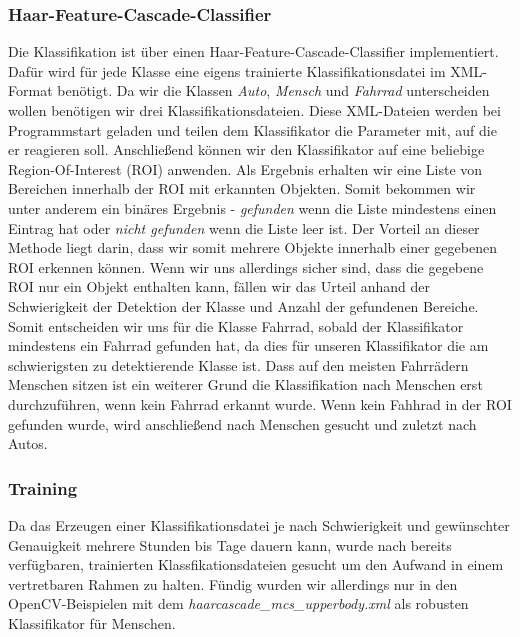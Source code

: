 \documentclass[conference]{IEEEtran}
\begin{document}
\subsubsection{Haar-Feature-Cascade-Classifier}

Die Klassifikation ist über einen Haar-Feature-Cascade-Classifier implementiert.
Dafür wird für jede Klasse eine eigens trainierte Klassifikationsdatei im XML-Format benötigt. Da wir die Klassen \textit{Auto}, \textit{Mensch} und \textit{Fahrrad} unterscheiden wollen benötigen wir drei Klassifikationsdateien. Diese XML-Dateien werden bei Programmstart geladen und teilen dem Klassifikator die Parameter mit, auf die er reagieren soll. Anschließend können wir den Klassifikator auf eine beliebige Region-Of-Interest (ROI) anwenden. Als Ergebnis erhalten wir eine Liste von Bereichen innerhalb der ROI mit erkannten Objekten. Somit bekommen wir unter anderem ein binäres Ergebnis - \textit{gefunden} wenn die Liste mindestens einen Eintrag hat oder \textit{nicht gefunden} wenn die Liste leer ist. Der Vorteil an dieser Methode liegt darin, dass wir somit mehrere Objekte innerhalb einer gegebenen ROI erkennen können. Wenn wir uns allerdings sicher sind, dass die gegebene ROI nur ein Objekt enthalten kann, fällen wir das Urteil anhand der Schwierigkeit der Detektion der Klasse und Anzahl der gefundenen Bereiche. Somit entscheiden wir uns für die Klasse Fahrrad, sobald der Klassifikator mindestens ein Fahrrad gefunden hat, da dies für unseren Klassifikator die am schwierigsten zu detektierende Klasse ist. Dass auf den meisten Fahrrädern Menschen sitzen ist ein weiterer Grund die Klassifikation nach Menschen erst durchzuführen, wenn kein Fahrrad erkannt wurde.
Wenn kein Fahhrad in der ROI gefunden wurde, wird anschließend nach Menschen gesucht und zuletzt nach Autos.


\subsubsection{Training}

Da das Erzeugen einer Klassifikationsdatei je nach Schwierigkeit und gewünschter Genauigkeit mehrere Stunden bis Tage dauern kann, wurde nach bereits verfügbaren, trainierten Klassfikationsdateien gesucht um den Aufwand in einem vertretbaren Rahmen zu halten. Fündig wurden wir allerdings nur in den OpenCV-Beispielen mit dem \textit{haarcascade\_mcs\_upperbody.xml} als robusten Klassifikator für Menschen. 
\end{document}
